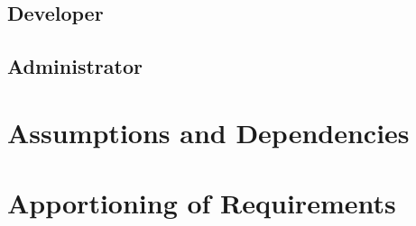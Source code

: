 \subsection{Developer}

\subsection{Administrator}



\section{Assumptions and Dependencies}
\section{Apportioning of Requirements}

